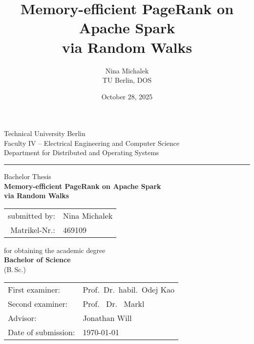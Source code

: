 \documentclass[a4paper,12pt]{article}
\title{Memory-efficient PageRank on Apache Spark\\ via Random Walks}
\author{Nina Michalek \\ TU Berlin, DOS}
\date{October 28, 2025}
\begin{document}
\begin{titlepage}
\setlength{\parindent}{0pt}
\vspace{8mm}
{\raggedright
Technical University Berlin\\
Faculty IV -- Electrical Engineering and Computer Science\\
Department for Distributed and Operating Systems\par
}
\vspace{8mm}
\hrule   %
\vspace{10mm}
\vspace{15mm}
\begin{center}
\Large Bachelor Thesis\\[15mm]
\Huge \textbf{Memory-efficient PageRank on Apache Spark\\ via Random Walks}
\end{center}
\vspace{10mm}
\begin{center}
\begin{tabular}{rl}
submitted by: & Nina Michalek \\
Matrikel-Nr.: & 469109 \\
\end{tabular}
\end{center}
\vspace{8mm}
\begin{center}
\onehalfspacing
for obtaining the academic degree \\
\large \textbf{Bachelor of Science} \\
\normalsize (B.\,Sc.)
\end{center}
\vfill
\onehalfspacing
\begin{tabular}{@{}ll}
First examiner: & Prof.\ Dr.\ habil.\ Odej Kao\\
Second examiner: & Prof. \ Dr. \ Markl \\
Advisor: & Jonathan Will\\
Date of submission: & \today
\end{tabular}
\end{titlepage}
\tableofcontents
\newpage
\vspace*{4ex}  %

\newpage
\vspace*{4ex}  %

\newpage
\vspace*{4ex}  %

\newpage
\vspace*{4ex}  %

\newpage
\vspace*{4ex}  %

\newpage
\vspace*{4ex}  %

\newpage

\end{document}
